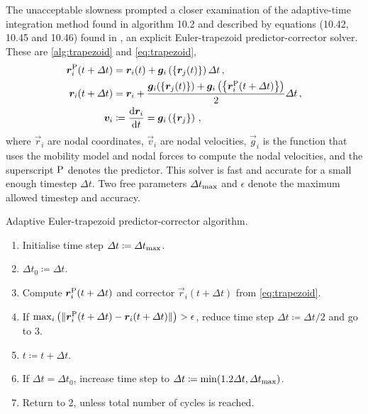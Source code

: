 The unacceptable slowness prompted a closer examination of the adaptive-time integration method found in algorithm 10.2 and described by equations (10.42, 10.45 and 10.46) found in \cite[p.~214--216]{ddlab}, an explicit Euler-trapezoid predictor-corrector solver. These are \cref{alg:trapezoid} and \cref{eq:trapezoid},
\begin{align}\label{eq:trapezoid}
    \vec{r}_i^{\rvar{P}}(t + \Delta t) & = \vec{r}_i(t) + \vec{g}_i\left(\left\{ \vec{r}_j(t) \right\}\right) \Delta t\,,                                                                     \\
    \vec{r}_i(t + \Delta t)            & = \vec{r}_i + \dfrac{\vec{g}_i(\left\{\vec{r}_j(t)\right\}) + \vec{g}_i\left(\left\{\vec{r}_i^{\rvar{P}}(t + \Delta t)\right\}\right)}{2}\Delta t\,, \\
    \vec{v}_i                          & \coloneqq \dfrac{\rvar{d}\vec{r}_i}{\rvar{d}t} = \vec{g}_i\left(\left\{\vec{r}_j\right\}\right)\,,
\end{align}
where $\vec{r}_i$ are nodal coordinates, $\vec{v}_i$ are nodal velocities, $\vec{g}_i$ is the function that uses the mobility model and nodal forces to compute the nodal velocities, and the superscript $\textrm{P}$ denotes the predictor. This solver is fast and accurate for a small enough timestep $\Delta t$. Two free parameters $\Delta t_{\textrm{max}}$ and $\epsilon$ denote the maximum allowed timestep and accuracy.
\begin{algorithm}\label{alg:trapezoid}
    \caption{Adaptive Euler-trapezoid predictor-corrector algorithm.}
    \begin{enumerate}
        \item Initialise time step $\Delta t \coloneqq \Delta t_{\textrm{max}}$.
        \item $\Delta t_0 \coloneqq \Delta t$.
        \item Compute $\vec{r}_i^{\rvar{P}}(t + \Delta t)$ and corrector $\vec{r}_i(t + \Delta t)$ from \cref{eq:trapezoid}.
        \item If $\max_i\left(\lVert \vec{r}_i^{\rvar{P}}(t + \Delta t) - \vec{r}_i(t + \Delta t)\rVert\right) > \epsilon$, reduce time step $\Delta t \coloneqq \Delta t / 2$ and go to 3.
        \item $t \coloneqq t + \Delta t$.
        \item If $\Delta t = \Delta t_0$, increase time step to $\Delta t \coloneqq \min(1.2 \Delta t, \Delta t_{\textrm{max}})$.
        \item Return to 2, unless total number of cycles is reached.
    \end{enumerate}
\end{algorithm}

